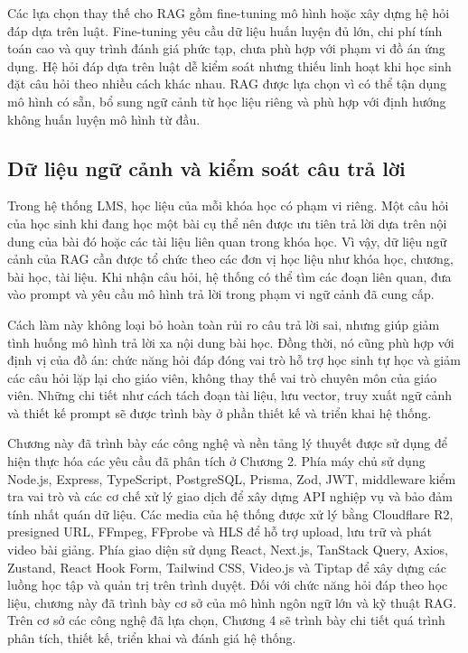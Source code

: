 \documentclass[../DoAn.tex]{subfiles}
\begin{document}
Các lựa chọn thay thế cho RAG gồm fine-tuning mô hình hoặc xây dựng hệ hỏi đáp dựa trên luật. Fine-tuning yêu cầu dữ liệu huấn luyện đủ lớn, chi phí tính toán cao và quy trình đánh giá phức tạp, chưa phù hợp với phạm vi đồ án ứng dụng. Hệ hỏi đáp dựa trên luật dễ kiểm soát nhưng thiếu linh hoạt khi học sinh đặt câu hỏi theo nhiều cách khác nhau. RAG được lựa chọn vì có thể tận dụng mô hình có sẵn, bổ sung ngữ cảnh từ học liệu riêng và phù hợp với định hướng không huấn luyện mô hình từ đầu.

\subsection{Dữ liệu ngữ cảnh và kiểm soát câu trả lời}
\label{subsection:3.3.3}

Trong hệ thống LMS, học liệu của mỗi khóa học có phạm vi riêng. Một câu hỏi của học sinh khi đang học một bài cụ thể nên được ưu tiên trả lời dựa trên nội dung của bài đó hoặc các tài liệu liên quan trong khóa học. Vì vậy, dữ liệu ngữ cảnh của RAG cần được tổ chức theo các đơn vị học liệu như khóa học, chương, bài học, tài liệu. Khi nhận câu hỏi, hệ thống có thể tìm các đoạn liên quan, đưa vào prompt và yêu cầu mô hình trả lời trong phạm vi ngữ cảnh đã cung cấp.

Cách làm này không loại bỏ hoàn toàn rủi ro câu trả lời sai, nhưng giúp giảm tình huống mô hình trả lời xa nội dung bài học. Đồng thời, nó cũng phù hợp với định vị của đồ án: chức năng hỏi đáp đóng vai trò hỗ trợ học sinh tự học và giảm các câu hỏi lặp lại cho giáo viên, không thay thế vai trò chuyên môn của giáo viên. Những chi tiết như cách tách đoạn tài liệu, lưu vector, truy xuất ngữ cảnh và thiết kế prompt sẽ được trình bày ở phần thiết kế và triển khai hệ thống.

Chương này đã trình bày các công nghệ và nền tảng lý thuyết được sử dụng để hiện thực hóa các yêu cầu đã phân tích ở Chương 2. Phía máy chủ sử dụng Node.js, Express, TypeScript, PostgreSQL, Prisma, Zod, JWT, middleware kiểm tra vai trò và các cơ chế xử lý giao dịch để xây dựng API nghiệp vụ và bảo đảm tính nhất quán dữ liệu. Các media của hệ thống được xử lý bằng Cloudflare R2, presigned URL, FFmpeg, FFprobe và HLS để hỗ trợ upload, lưu trữ và phát video bài giảng. Phía giao diện sử dụng React, Next.js, TanStack Query, Axios, Zustand, React Hook Form, Tailwind CSS, Video.js và Tiptap để xây dựng các luồng học tập và quản trị trên trình duyệt. Đối với chức năng hỏi đáp theo học liệu, chương này đã trình bày cơ sở của mô hình ngôn ngữ lớn và kỹ thuật RAG. Trên cơ sở các công nghệ đã lựa chọn, Chương 4 sẽ trình bày chi tiết quá trình phân tích, thiết kế, triển khai và đánh giá hệ thống.
\end{document}
